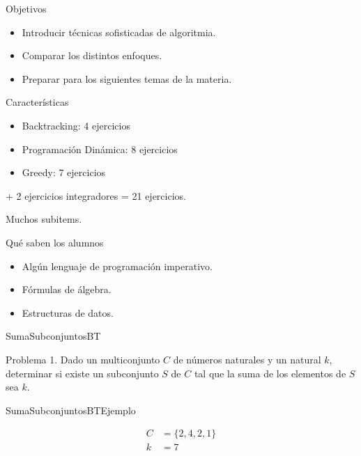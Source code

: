 \documentclass{beamer}
\begin{document}
\begin{frame}{Objetivos}
    \begin{itemize}[<+->]
        \item Introducir técnicas sofisticadas de algoritmia.
        \item Comparar los distintos enfoques.
        \item Preparar para los siguientes temas de la materia.
    \end{itemize}
\end{frame}


\begin{frame}{Características}
    \begin{itemize}
        \item Backtracking: 4 ejercicios
        \item Programación Dinámica: 8 ejercicios
        \item Greedy: 7 ejercicios
    \end{itemize}
    + 2 ejercicios integradores = 21 ejercicios.
    \vspace{1em}

     Muchos subitems.
\end{frame}

\begin{frame}{Qué saben los alumnos}
    \begin{itemize}[<+->]
        \item Algún lenguaje de programación imperativo.
        \item Fórmulas de álgebra.
        \item Estructuras de datos.
    \end{itemize}
\end{frame}

\begin{frame}{SumaSubconjuntosBT}
    \begin{block}{Problema}
        1. Dado un multiconjunto $C$ de números naturales y un natural $k$, determinar si existe un subconjunto $S$ de $C$ tal que la suma de los elementos de $S$ sea $k$. 
    \end{block}
\end{frame}

\begin{frame}{SumaSubconjuntosBT}{Ejemplo}
    
    {\Huge 
    \begin{align*}
        C &= \{2,4,2,1\}\\
        k &= 7
    \end{align*}
    }
\end{frame}
\end{document}
